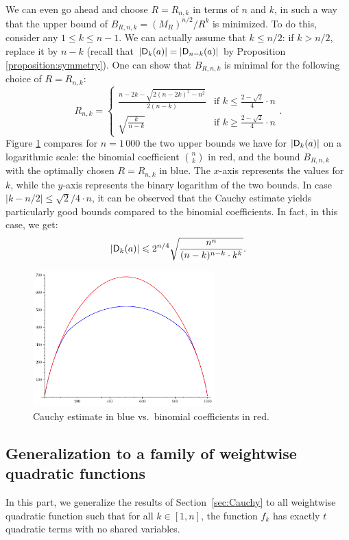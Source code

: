 \documentclass[11pt]{llncs}
\begin{document}
{\begin{remark}
    We can even go ahead and choose $R=R_{n,k}$ in terms of $n$ and $k$, in such a way that the upper bound of $B_{R,n,k}=(M_R)^{n/2}/R^k$ is minimized. To do this, consider any $1\leq k\leq n-1$. We can actually assume that $k\leq n/2$: if $k>n/2$, replace it by $n-k$ (recall that $|\Dnka nka|=|\Dnka n{n-k}a|$ by Proposition \ref{proposition:symmetry}). One can show that $B_{R,n,k}$ is minimal for the following choice of $R=R_{n,k}$:
    \[
        R_{n,k}=\begin{cases}
            \frac{n-2k-\sqrt{2(n-2k)^2-n^2}}{2(n-k)}&\text{if $k\leq\frac{2-\sqrt 2}{4}\cdot n$}\\
            \sqrt{\frac{k}{n-k}}&\text{if $k\geq\frac{2-\sqrt 2}{4}\cdot n$}
        \end{cases}.
    \]
    Figure \ref{fig:cauchy_estimate} compares for $n=1\,000$ the two upper bounds we have for $|\Dnka nka|$ on a logarithmic scale: the binomial coefficient $\binom nk$ in red, and the bound $B_{R,n,k}$ with the optimally chosen $R=R_{n,k}$ in blue. The $x$-axis represents the values for $k$, while the $y$-axis represents the binary logarithm of the two bounds. In case $|k-n/2|\leq\sqrt{2}/4\cdot n$, it can be observed that the Cauchy estimate yields particularly good bounds compared to the binomial coefficients. In fact, in this case, we get:
    \[
        |\Dnka nka|\leq 2^{n/4}\sqrt{\frac{n^n}{(n-k)^{n-k}\cdot k^k}}.
    \]
    \begin{figure}
        \centering
        \includegraphics[width=7cm]{cauchy_estimate.pdf}
        \caption{Cauchy estimate in blue vs.\ binomial coefficients in red.}
        \label{fig:cauchy_estimate}
    \end{figure}
\end{remark}}




\subsection{Generalization to a family of weightwise quadratic functions}\label{sec:general}
In this part, we generalize the results of Section~\ref{sec:Cauchy} to all weightwise quadratic function such that for all $k\in [1,n]$, the function $f_k$ has exactly $t$ quadratic terms with no shared variables.
\end{document}
